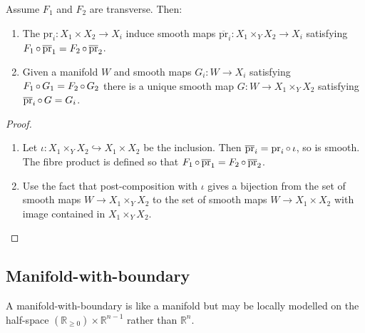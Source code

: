 \documentclass[a4paper,11pt]{article}
\begin{document}
	\begin{prop}
		Assume $F_1$ and $F_2$ are transverse. Then:
		\begin{enumerate}
			\item The $\mathrm{pr}_i : X_1 \times X_2 \to X_i$ induce smooth maps $\mathrm{\overline{pr}}_i : X_1 \times_Y X_2 \to X_i$ satisfying $F_1 \operatorname{\circ} \mathrm{\overline{pr}}_1 = F_2 \operatorname{\circ} \mathrm{\overline{pr}}_2$. 
			\item Given a manifold $W$ and smooth maps $G_i: W \to X_i$ satisfying $F_1 \operatorname{\circ} G_1 = F_2 \operatorname{\circ} G_2$ there is a unique smooth map $G : W \to X_1 \times_Y X_2$ satisfying $\mathrm{\overline{pr}}_i \operatorname{\circ} G = G_i$.
			\begin{center}
			\end{center} 
		\end{enumerate}
	\end{prop}
	\begin{proof}
		\ 
		\begin{enumerate}
			\item Let $\iota : X_1 \times_Y X_2 \hookrightarrow X_1 \times X_2$ be the inclusion. Then $\mathrm{\overline{pr}}_i = \mathrm{pr}_i \operatorname{\circ} \iota$, so is smooth. The fibre product is defined so that $F_1 \operatorname{\circ} \mathrm{\overline{pr}}_1 = F_2 \operatorname{\circ} \mathrm{\overline{pr}}_2$.
			\item Use the fact that post-composition with $\iota$ gives a bijection from the set of smooth maps $W \to X_1 \times_Y X_2$ to the set of smooth maps $W \to X_1 \times X_2$ with image contained in $X_1 \times_Y X_2$.
		\end{enumerate}
	\end{proof}

	\subsection{Manifold-with-boundary} 

	A manifold-with-boundary is like a manifold but may be locally modelled on the half-space $(\mathbb{R} _{\geq 0})\times \mathbb{R}^{n-1}$ rather than $\mathbb{R}^n$.
	
\end{document}
